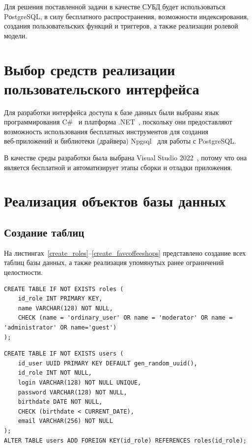 Для решения поставленной задачи в качестве СУБД будет использоваться PоstgreSQL, в силу бесплатного распространения, возможности индексирования, создания пользовательских функций и триггеров, а также реализации ролевой модели.


\section{Выбор средств реализации пользовательского интерфейса}


Для разработки интерфейса доступа к базе данных были выбраны язык программирования C\#~\cite{csharp} и платформа .NET~\cite{dotnet}, поскольку они предоставляют возможность \hfill использования \hfill бесплатных \hfill инструментов \hfill для \hfill создания \\ \mbox{веб-приложений} и  библиотеки (драйвера) Npgsql~\cite{npgsql} для работы с PostgreSQL.

В качестве среды разработки была выбрана Visual Studio 2022~\cite{vs}, потому что она является бесплатной и автоматизирует этапы сборки и отладки приложения.

\newpage 
\section{Реализация объектов базы данных}
\subsection{Создание таблиц}


На листингах~\ref{create_roles}--\ref{create_favcoffeeshops} представлено создание всех таблиц базы данных, а также реализация упомянутых ранее ограничений целостности.
\begin{center}
	\captionsetup{justification=raggedright,singlelinecheck=off}
	\begin{lstlisting}[label=create_roles,caption=Создание таблицы roles]
CREATE TABLE IF NOT EXISTS roles (
	id_role INT PRIMARY KEY,
	name VARCHAR(128) NOT NULL, 
	CHECK (name = 'ordinary_user' OR name = 'moderator' OR name = 'administrator' OR name='guest')
);
		\end{lstlisting}
\end{center}

\begin{center}
	\captionsetup{justification=raggedright,singlelinecheck=off}
	\begin{lstlisting}[label=create_users,caption=Создание таблицы users]
CREATE TABLE IF NOT EXISTS users (
	id_user UUID PRIMARY KEY DEFAULT gen_random_uuid(),
	id_role INT NOT NULL,
	login VARCHAR(128) NOT NULL UNIQUE,
	password VARCHAR(128) NOT NULL,
	birthdate DATE NOT NULL,
	CHECK (birthdate < CURRENT_DATE),
	email VARCHAR(256) NOT NULL
);
ALTER TABLE users ADD FOREIGN KEY(id_role) REFERENCES roles(id_role);
	\end{lstlisting}
\end{center}

